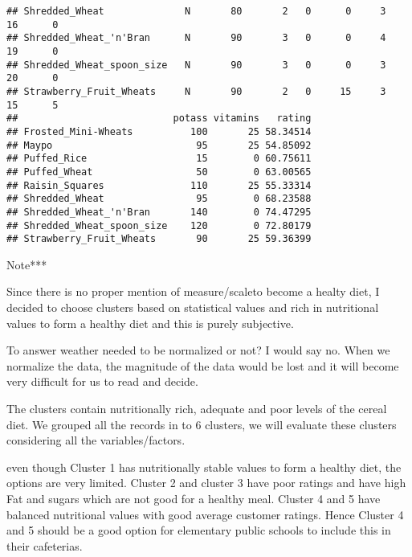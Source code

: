 \documentclass[
]{article}
\begin{document}
\begin{verbatim}
## Shredded_Wheat              N       80       2   0      0     3    16      0
## Shredded_Wheat_'n'Bran      N       90       3   0      0     4    19      0
## Shredded_Wheat_spoon_size   N       90       3   0      0     3    20      0
## Strawberry_Fruit_Wheats     N       90       2   0     15     3    15      5
##                           potass vitamins   rating
## Frosted_Mini-Wheats          100       25 58.34514
## Maypo                         95       25 54.85092
## Puffed_Rice                   15        0 60.75611
## Puffed_Wheat                  50        0 63.00565
## Raisin_Squares               110       25 55.33314
## Shredded_Wheat                95        0 68.23588
## Shredded_Wheat_'n'Bran       140        0 74.47295
## Shredded_Wheat_spoon_size    120        0 72.80179
## Strawberry_Fruit_Wheats       90       25 59.36399
\end{verbatim}

Note***

Since there is no proper mention of measure/scaleto become a healty
diet, I decided to choose clusters based on statistical values and rich
in nutritional values to form a healthy diet and this is purely
subjective.

To answer weather needed to be normalized or not? I would say no. When
we normalize the data, the magnitude of the data would be lost and it
will become very difficult for us to read and decide.

The clusters contain nutritionally rich, adequate and poor levels of the
cereal diet. We grouped all the records in to 6 clusters, we will
evaluate these clusters considering all the variables/factors.

even though Cluster 1 has nutritionally stable values to form a healthy
diet, the options are very limited. Cluster 2 and cluster 3 have poor
ratings and have high Fat and sugars which are not good for a healthy
meal. Cluster 4 and 5 have balanced nutritional values with good average
customer ratings. Hence Cluster 4 and 5 should be a good option for
elementary public schools to include this in their cafeterias.
\end{document}
